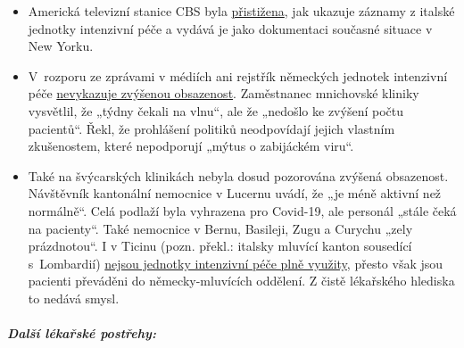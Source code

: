\begin{itemize}
\tightlist
\item
  Americká televizní stanice CBS byla
  \href{https://www.theblaze.com/news/cbs-news-footage-italy-hospital-nyc}{přistižena},
  jak ukazuje záznamy z italské jednotky intenzivní péče a vydává je
  jako dokumentaci současné situace v New Yorku.\\
\item
  V~rozporu ze zprávami v médiích ani rejstřík německých jednotek
  intenzivní péče
  \href{https://www.divi.de/register/intensivregister}{nevykazuje
  zvýšenou obsazenost}. Zaměstnanec mnichovské kliniky vysvětlil, že
  „týdny čekali na vlnu``, ale že „nedošlo ke zvýšení počtu pacientů``.
  Řekl, že prohlášení politiků neodpovídají jejich vlastním zkušenostem,
  které nepodporují „mýtus o zabijáckém viru``.
\item
  Také na švýcarských klinikách nebyla dosud pozorována zvýšená
  obsazenost. Návštěvník kantonální nemocnice v Lucernu uvádí, že „je
  méně aktivní než normálně``. Celá podlaží byla vyhrazena pro Covid-19,
  ale personál „stále čeká na pacienty``. Také nemocnice v Bernu,
  Basileji, Zugu a Curychu „zely prázdnotou``. I v Ticinu (pozn. překl.:
  italsky mluvící kanton sousedící s~Lombardií)
  \href{https://www.nzz.ch/schweiz/tessin-verlegt-erste-corona-patienten-in-deutschschweizer-spitaeler-ld.1549417}{nejsou
  jednotky intenzivní péče plně využity}, přesto však jsou pacienti
  převáděni do německy-mluvících oddělení. Z čistě lékařského hlediska
  to nedává smysl.\\
\end{itemize}

\hypertarget{dalux161uxed-luxe9kaux159skuxe9-postux159ehy}{%
\subparagraph{\texorpdfstring{\textbf{Další lékařské
postřehy:}}{Další lékařské postřehy:}}\label{dalux161uxed-luxe9kaux159skuxe9-postux159ehy}}

